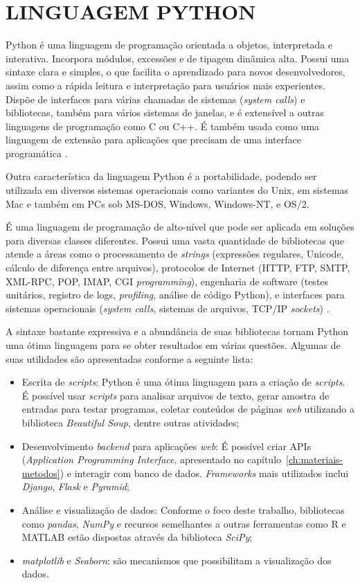 \section{LINGUAGEM PYTHON}\label{sec:python}
Python é uma linguagem de programação orientada a objetos, interpretada e interativa. Incorpora módulos, excessões e de tipagem dinâmica alta. Possui uma sintaxe clara e simples, o que facilita o aprendizado para novos desenvolvedores, assim como a rápida leitura e interpretação para usuários mais experientes. Dispõe de interfaces para várias chamadas de sistemas (\textit{system calls}) e bibliotecas, também para vários sistemas de janelas, e é extensível a outras linguagens de programação como C ou C++. É também usada como uma linguagem de extensão para aplicações que precisam de uma interface programática \cite{python-doc}.

Outra característica da linguagem Python é a portabilidade, podendo ser utilizada em diversos sistemas operacionais como variantes do Unix, em sistemas Mac e também em PCs sob MS-DOS, Windows, Windows-NT, e OS/2.

É uma linguagem de programação de alto-nível que pode ser aplicada em soluções para diversas classes diferentes. Possui uma vasta quantidade de bibliotecas que atende a áreas como o processamento de \textit{strings} (expressões regulares, Unicode, cálculo de diferença entre arquivos), protocolos de Internet (HTTP, FTP, SMTP, XML-RPC, POP, IMAP, CGI \textit{programming}), engenharia de software (testes unitários, registro de logs, \textit{profiling}, análise de código Python), e interfaces para sistemas operacionais (\textit{system calls}, sistemas de arquivos, TCP/IP \textit{sockets}) \cite{python-doc}.

A sintaxe bastante expressiva e a abundância de suas bibliotecas tornam Python uma ótima linguagem para se obter resultados em várias questões. Algumas de suas utilidades são apresentadas conforme a seguinte lista:

\begin{itemize}
	\item Escrita de \textit{scripts}: Python é uma ótima linguagem para a criação de \textit{scripts}. É possível usar \textit{scripts} para analisar arquivos de texto, gerar amostra de entradas para testar programas, coletar conteúdos de páginas \textit{web} utilizando a biblioteca \textit{Beautiful Soup}, dentre outras atividades;
	\item Desenvolvimento \textit{backend} para aplicações \textit{web}: É possível criar APIs (\textit{Application Programming Interface}, apresentado no capítulo~\ref{ch:materiais-metodos}) e interagir com banco de dados. \textit{Frameworks} mais utilizados inclui \textit{Django}, \textit{Flask} e \textit{Pyramid};
	\item Análise e visualização de dados: Conforme o foco deste trabalho, bibliotecas como \textit{pandas}, \textit{NumPy} e recursos semelhantes a outras ferramentas como R e MATLAB estão dispostas através da biblioteca \textit{SciPy};
	\item \textit{matplotlib} e \textit{Seaborn}: são mecanismos que possibilitam a visualização dos dados.
\end{itemize}

